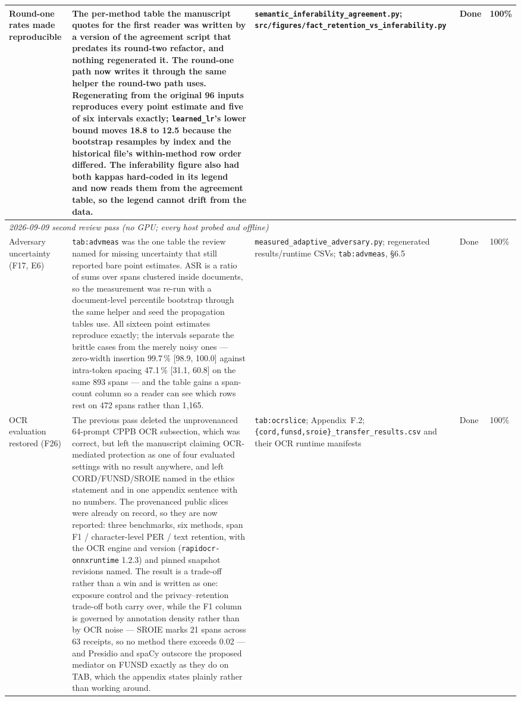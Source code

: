 \documentclass[11pt]{article}
\begin{document}
\begin{longtable}{p{}p{}p{}p{}p{}}
Round-one rates made reproducible & The per-method table the manuscript quotes for the first reader was written by a version of the agreement script that predates its round-two refactor, and nothing regenerated it. The round-one path now writes it through the same helper the round-two path uses. Regenerating from the original 96 inputs reproduces every point estimate and five of six intervals exactly; \texttt{learned\_lr}'s lower bound moves 18.8 to 12.5 because the bootstrap resamples by index and the historical file's within-method row order differed. The inferability figure also had both kappas hard-coded in its legend and now reads them from the agreement table, so the legend cannot drift from the data. & \texttt{semantic\_inferability\_agreement.py}; \texttt{src/figures/fact\_retention\_vs\_inferability.py} & Done & 100\% \\
\midrule
\multicolumn{5}{l}{\emph{2026-09-09 second review pass (no GPU; every host probed and offline)}} \\
\midrule
Adversary uncertainty (F17, E6) & \texttt{tab:advmeas} was the one table the review named for missing uncertainty that still reported bare point estimates. ASR is a ratio of sums over spans clustered inside documents, so the measurement was re-run with a document-level percentile bootstrap through the same helper and seed the propagation tables use. All sixteen point estimates reproduce exactly; the intervals separate the brittle cases from the merely noisy ones --- zero-width insertion 99.7\,\% [98.9, 100.0] against intra-token spacing 47.1\,\% [31.1, 60.8] on the same 893 spans --- and the table gains a span-count column so a reader can see which rows rest on 472 spans rather than 1{,}165. & \texttt{measured\_adaptive\_adversary.py}; regenerated results/runtime CSVs; \texttt{tab:advmeas}, \S6.5 & Done & 100\% \\
OCR evaluation restored (F26) & The previous pass deleted the unprovenanced 64-prompt CPPB OCR subsection, which was correct, but left the manuscript claiming OCR-mediated protection as one of four evaluated settings with no result anywhere, and left CORD/FUNSD/SROIE named in the ethics statement and in one appendix sentence with no numbers. The provenanced public slices were already on record, so they are now reported: three benchmarks, six methods, span F1 / character-level PER / text retention, with the OCR engine and version (\texttt{rapidocr-onnxruntime} 1.2.3) and pinned snapshot revisions named. The result is a trade-off rather than a win and is written as one: exposure control and the privacy--retention trade-off both carry over, while the F1 column is governed by annotation density rather than by OCR noise --- SROIE marks 21 spans across 63 receipts, so no method there exceeds 0.02 --- and Presidio and spaCy outscore the proposed mediator on FUNSD exactly as they do on TAB, which the appendix states plainly rather than working around. & \texttt{tab:ocrslice}; Appendix~F.2; \texttt{\{cord,funsd,sroie\}\_transfer\_results.csv} and their OCR runtime manifests & Done & 100\% \\

\end{longtable}
\end{document}
